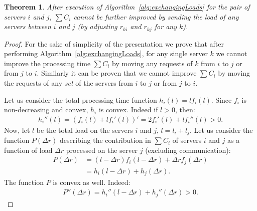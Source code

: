 \documentclass[11pt]{article}
\newtheorem{theorem}{Theorem}
\begin{document}
\begin{theorem}\label{lemma::delegationOptimality}
After execution of Algorithm~\ref{alg:exchangingLoads} for the pair of servers $i$ and $j$, $\sum C_{i}$ cannot be further improved by sending the load of any servers between $i$ and $j$ (by adjusting $r_{ki}$ and $r_{kj}$ for any $k$).
\end{theorem}
\begin{proof}
For the sake of simplicity of the presentation we prove that after performing Algorithm~\ref{alg:exchangingLoads}, for any single server $k$ we cannot improve the processing time $\sum{C_i}$ by moving any requests of $k$ from $i$ to $j$ or from $j$ to $i$. Similarly it can be proven that we cannot improve $\sum{C_i}$ by moving the requests of any \emph{set} of the servers from $i$ to $j$ or from $j$ to $i$.

Let us consider the total processing time function $h_i(l) = lf_{i}(l)$. Since $f_{i}$ is non-decreasing and convex, $h_i$ is convex. Indeed if $l > 0$, then:
\begin{align*}
h_i''(l) = (f_{i}(l) + lf_{i}'(l))' = 2f_{i}'(l) + lf_{i}''(l) > 0 \textrm{.}
\end{align*}
Now, let $l$ be the total load on the servers $i$ and $j$, $l = l_i + l_j$. Let us consider the function $P(\Delta r)$ describing the contribution in $\sum{C_i}$ of servers $i$ and $j$ as a function of load $\Delta r$ processed on the server $j$ (excluding communication): 
\begin{align*}
P(\Delta r) &= (l - \Delta r)f_i(l - \Delta r) +  \Delta rf_j(\Delta r)  \\
              &= h_i(l - \Delta r) + h_j(\Delta r) \textrm{.}
\end{align*}
The function $P$ is convex as well. Indeed:
\begin{align*}
P''(\Delta r) = h_i''(l - \Delta r) + h_j''(\Delta r) > 0 \textrm{.}
\end{align*}


\end{proof}
\end{document}
